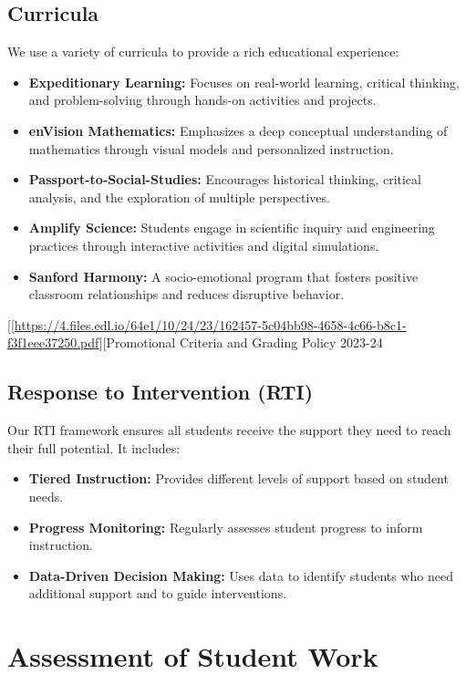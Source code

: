 \documentclass[11pt]{article}
\begin{document}
\subsection{Curricula}
\label{sec:org73edfd8}
We use a variety of curricula to provide a rich educational experience:
\begin{itemize}
\item \textbf{\textbf{Expeditionary Learning:}} Focuses on real-world learning, critical thinking, and problem-solving through hands-on activities and projects.
\item \textbf{\textbf{enVision Mathematics:}} Emphasizes a deep conceptual understanding of mathematics through visual models and personalized instruction.
\item \textbf{\textbf{Passport-to-Social-Studies:}} Encourages historical thinking, critical analysis, and the exploration of multiple perspectives.
\item \textbf{\textbf{Amplify Science:}} Students engage in scientific inquiry and engineering practices through interactive activities and digital simulations.
\item \textbf{\textbf{Sanford Harmony:}} A socio-emotional program that fosters positive classroom relationships and reduces disruptive behavior.
\end{itemize}

[[\url{https://4.files.edl.io/64e1/10/24/23/162457-5c04bb98-4658-4c66-b8c1-f3f1eee37250.pdf}][Promotional Criteria and Grading Policy 2023-24

\subsection{Response to Intervention (RTI)}
\label{sec:orge0728ee}

Our RTI framework ensures all students receive the support they need to reach their full potential. It includes:
\begin{itemize}
\item \textbf{\textbf{Tiered Instruction:}} Provides different levels of support based on student needs.
\item \textbf{\textbf{Progress Monitoring:}} Regularly assesses student progress to inform instruction.
\item \textbf{\textbf{Data-Driven Decision Making:}} Uses data to identify students who need additional support and to guide interventions.
\end{itemize}

\section{Assessment of Student Work}
\label{sec:org6e00834}
\end{document}
